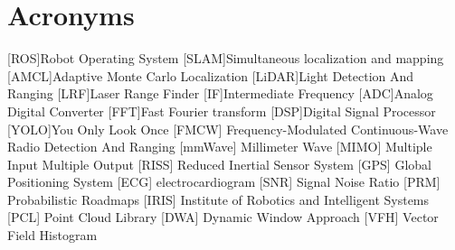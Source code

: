 \chapter*{Acronyms}
	\begin{acronym}[RELAX NG]
	[ROS]{Robot Operating System}
	[SLAM]{Simultaneous localization and mapping}
    [AMCL]{Adaptive Monte Carlo Localization}
    [LiDAR]{Light Detection And Ranging}
	[LRF]{Laser Range Finder}
	[IF]{Intermediate Frequency}
	[ADC]{Analog Digital Converter}
	[FFT]{Fast Fourier transform}
    [DSP]{Digital Signal Processor}
	[YOLO]{You Only Look Once}
	 [FMCW] {Frequency-Modulated Continuous-Wave}
	 {Radio Detection And Ranging}
	[mmWave] {Millimeter Wave}
	[MIMO] {Multiple Input Multiple Output}
	[RISS] {Reduced Inertial Sensor System}
	[GPS] {Global Positioning System}
	[ECG] {electrocardiogram}
	[SNR] {Signal Noise Ratio}
	[PRM] {Probabilistic Roadmaps}
	[IRIS] {Institute of Robotics and Intelligent Systems}
	[PCL] {Point Cloud Library}
	[DWA] {Dynamic Window Approach}
	[VFH] {Vector Field Histogram}
	
	
	\end{acronym}